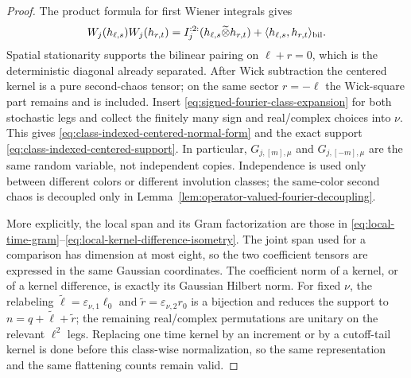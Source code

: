 \documentclass[10pt]{amsart}
\numberwithin{equation}{section}
\theoremstyle{plain}
\theoremstyle{definition}
\theoremstyle{remark}
\begin{document}
\begin{proof}
The product formula for first Wiener integrals gives
\[
        W_j(h_{\ell,s})W_j(h_{r,t})
        =I_j^{:2:}(h_{\ell,s}\widetilde\otimes h_{r,t})
         +\langle h_{\ell,s},h_{r,t}\rangle_{\rm bil}.
\]
Spatial stationarity supports the bilinear pairing on $\ell+r=0$, which is the deterministic diagonal already separated.  After Wick subtraction the centered kernel is a pure second-chaos tensor; on the same sector $r=-\ell$ the Wick-square part remains and is included.  Insert \eqref{eq:signed-fourier-class-expansion} for both stochastic legs and collect the finitely many sign and real/complex choices into $\nu$.  This gives \eqref{eq:class-indexed-centered-normal-form} and the exact support \eqref{eq:class-indexed-centered-support}.  In particular, $G_{j,[m],\mu}$ and $G_{j,[-m],\mu}$ are the same random variable, not independent copies.  Independence is used only between different colors or different involution classes; the same-color second chaos is decoupled only in Lemma~\ref{lem:operator-valued-fourier-decoupling}.

More explicitly, the local span and its Gram factorization are those in
\eqref{eq:local-time-gram}--\eqref{eq:local-kernel-difference-isometry}.  The
joint span used for a comparison has dimension at most eight, so the two
coefficient tensors are expressed in the same Gaussian coordinates.  The
coefficient norm of a kernel, or of a kernel difference, is exactly its
Gaussian Hilbert norm.  For fixed $\nu$, the relabeling
$\widetilde\ell=\varepsilon_{\nu,1}\ell_0$ and
$\widetilde r=\varepsilon_{\nu,2}r_0$ is a bijection and reduces the support to
$n=q+\widetilde\ell+\widetilde r$; the remaining real/complex permutations are
unitary on the relevant $\ell^2$ legs.  Replacing one time
kernel by an increment or by a cutoff-tail kernel is done before this
class-wise normalization, so the same representation and the same flattening
counts remain valid.
\end{proof}
\end{document}
